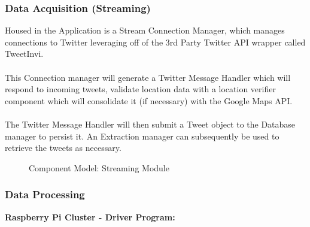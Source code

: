 \documentclass[12pt]{article} %
\begin{document}
	\subsubsection{Data Acquisition (Streaming)}
	
	Housed in the Application is a Stream Connection Manager, which manages connections to Twitter leveraging off of the 3rd Party Twitter API wrapper called TweetInvi.\\
	\
	\\
	This Connection manager will generate a Twitter Message Handler which will respond to incoming tweets, validate location data with a location verifier component which will consolidate it (if necessary) with the Google Maps API. \\
	\
	\\
	The Twitter Message Handler will then submit a Tweet object to the Database manager to persist it. An Extraction manager can subsequently be used to retrieve the tweets as necessary.
	
		\begin{figure}[H] %
			\caption{Component Model: Streaming Module}
			\label{fig:speciation}
		\end{figure}
	
	\subsubsection{Data Processing}
	
	
	\textbf{Raspberry Pi Cluster - Driver Program:}
	
\end{document}
